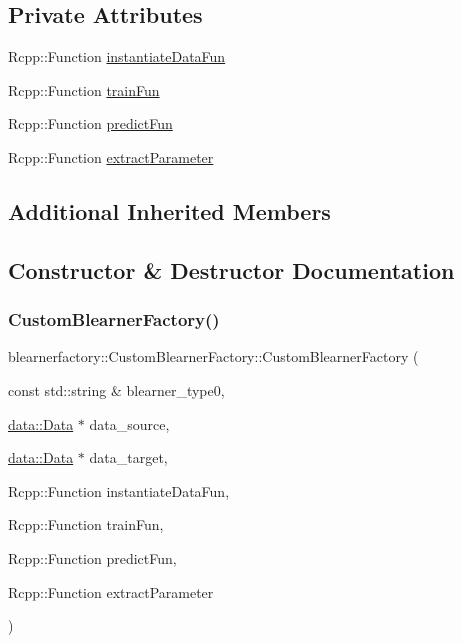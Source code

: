 \subsection*{Private Attributes}
\begin{DoxyCompactItemize}
\item 
Rcpp\+::\+Function \mbox{\hyperlink{classblearnerfactory_1_1_custom_blearner_factory_a4237eeedc4a844cd02c52671a1f9191f}{instantiate\+Data\+Fun}}
\item 
Rcpp\+::\+Function \mbox{\hyperlink{classblearnerfactory_1_1_custom_blearner_factory_ac342da04b06c4e707811e4b312ce6c61}{train\+Fun}}
\item 
Rcpp\+::\+Function \mbox{\hyperlink{classblearnerfactory_1_1_custom_blearner_factory_a6cf80331e6ce5d8cabb25d7af09f9eea}{predict\+Fun}}
\item 
Rcpp\+::\+Function \mbox{\hyperlink{classblearnerfactory_1_1_custom_blearner_factory_a4db9694f117bf43facdb7522d8cd0de1}{extract\+Parameter}}
\end{DoxyCompactItemize}
\subsection*{Additional Inherited Members}


\subsection{Constructor \& Destructor Documentation}
\mbox{\label{classblearnerfactory_1_1_custom_blearner_factory_a1a006cb772dc79cbcbcab810f5431b2c}} 
\subsubsection{\texorpdfstring{Custom\+Blearner\+Factory()}{CustomBlearnerFactory()}}
{\footnotesize\ttfamily blearnerfactory\+::\+Custom\+Blearner\+Factory\+::\+Custom\+Blearner\+Factory (\begin{DoxyParamCaption}\item[{const std\+::string \&}]{blearner\+\_\+type0,  }\item[{\mbox{\hyperlink{classdata_1_1_data}{data\+::\+Data}} $\ast$}]{data\+\_\+source,  }\item[{\mbox{\hyperlink{classdata_1_1_data}{data\+::\+Data}} $\ast$}]{data\+\_\+target,  }\item[{Rcpp\+::\+Function}]{instantiate\+Data\+Fun,  }\item[{Rcpp\+::\+Function}]{train\+Fun,  }\item[{Rcpp\+::\+Function}]{predict\+Fun,  }\item[{Rcpp\+::\+Function}]{extract\+Parameter }\end{DoxyParamCaption})}

